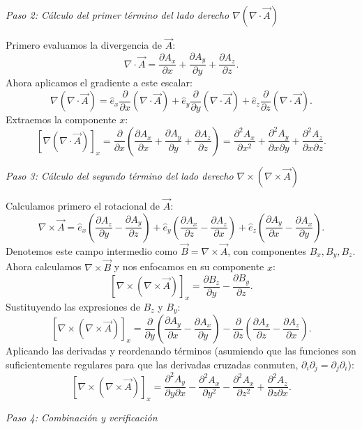 \documentclass[a4paper]{article}
\begin{document}
\noindent\textit{Paso 2: Cálculo del primer término del lado derecho $\nabla(\nabla \cdot \vec{A})$}

Primero evaluamos la divergencia de $\vec{A}$:
$$
\nabla \cdot \vec{A} = \frac{\partial A_x}{\partial x} + \frac{\partial A_y}{\partial y} + \frac{\partial A_z}{\partial z}.
$$
Ahora aplicamos el gradiente a este escalar:
$$
\nabla(\nabla \cdot \vec{A}) = \hat{e}_x \frac{\partial}{\partial x}(\nabla \cdot \vec{A}) + \hat{e}_y \frac{\partial}{\partial y}(\nabla \cdot \vec{A}) + \hat{e}_z \frac{\partial}{\partial z}(\nabla \cdot \vec{A}).
$$
Extraemos la componente $x$:
$$
[\nabla(\nabla \cdot \vec{A})]_x = \frac{\partial}{\partial x}\left( \frac{\partial A_x}{\partial x} + \frac{\partial A_y}{\partial y} + \frac{\partial A_z}{\partial z} \right) = \frac{\partial^2 A_x}{\partial x^2} + \frac{\partial^2 A_y}{\partial x \partial y} + \frac{\partial^2 A_z}{\partial x \partial z}.
$$

\noindent\textit{Paso 3: Cálculo del segundo término del lado derecho $\nabla \times (\nabla \times \vec{A})$}

Calculamos primero el rotacional de $\vec{A}$:
$$
\nabla \times \vec{A} = \hat{e}_x\left( \frac{\partial A_z}{\partial y} - \frac{\partial A_y}{\partial z} \right) + \hat{e}_y\left( \frac{\partial A_x}{\partial z} - \frac{\partial A_z}{\partial x} \right) + \hat{e}_z\left( \frac{\partial A_y}{\partial x} - \frac{\partial A_x}{\partial y} \right).
$$
Denotemos este campo intermedio como $\vec{B} = \nabla \times \vec{A}$, con componentes $B_x, B_y, B_z$. Ahora calculamos $\nabla \times \vec{B}$ y nos enfocamos en su componente $x$:
$$
[\nabla \times (\nabla \times \vec{A})]_x = \frac{\partial B_z}{\partial y} - \frac{\partial B_y}{\partial z}.
$$
Sustituyendo las expresiones de $B_z$ y $B_y$:
$$
[\nabla \times (\nabla \times \vec{A})]_x = \frac{\partial}{\partial y}\left( \frac{\partial A_y}{\partial x} - \frac{\partial A_x}{\partial y} \right) - \frac{\partial}{\partial z}\left( \frac{\partial A_x}{\partial z} - \frac{\partial A_z}{\partial x} \right).
$$
Aplicando las derivadas y reordenando términos (asumiendo que las funciones son suficientemente regulares para que las derivadas cruzadas conmuten, $\partial_i \partial_j = \partial_j \partial_i$):
$$
[\nabla \times (\nabla \times \vec{A})]_x = \frac{\partial^2 A_y}{\partial y \partial x} - \frac{\partial^2 A_x}{\partial y^2} - \frac{\partial^2 A_x}{\partial z^2} + \frac{\partial^2 A_z}{\partial z \partial x}.
$$

\noindent\textit{Paso 4: Combinación y verificación}
\end{document}
